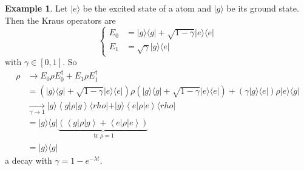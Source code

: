 \documentclass[12pt]{book}
\theoremstyle{definition}
\newtheorem*{expl}{\bfseries Example}
\newcommand{\scalar}[1]{\left\langle {#1}\right\rangle}
\let\shortto\to
\renewcommand{\to}{\longrightarrow}
\newcommand{\para}[1]{\left( {#1} \right)}
\newcommand{\bra}[1]{\langle {#1} \vert}
\newcommand{\ket}[1]{\vert {#1} \rangle}
\DeclareMathOperator{\tr}{tr}
\begin{document}
\begin{expl}
Let $\ket{e}$ be the excited state of a atom and $\ket{g}$ be its ground state. Then the Kraus operators are
\begin{equation*}
  \begin{cases}
    E_0 & = \ket{g}\bra{g} + \sqrt{1 - \gamma} \ket{e} \bra{e} \\
    E_1 & = \sqrt{\gamma} \ket{g}\bra{e}
  \end{cases}
\end{equation*}
with $\gamma \in [0, 1]$. So
\begin{align*}
  \rho & \to E_0 \rho E_0^\dagger + E_1 \rho E_1^\dagger \\
  & = \para{\ket{g} \bra{g} + \sqrt{1 - \gamma} \ket{e} \bra{e}} \rho \para{\ket{g} \bra{g} + \sqrt{1 - \gamma} \ket{e} \bra{e}} +   \para{\gamma \ket{g}\bra{e}} \rho \ket{e}\bra{g} \\
  & \underset{\gamma \shortto 1}{\to} \ket{g}\scalar{g \vert \rho \vert g} \bra{rho} + \ket{g}\scalar{e \vert \rho \vert e} \bra{rho} \\
  & = \ket{g}\bra{g} \underbrace{\para{\scalar{g \vert \rho \vert g} + \scalar{e \vert \rho \vert e}}}_{\tr \rho = 1} \\
  & = \ket{g}\bra{g}
\end{align*}
a decay with $\gamma = 1 - e^{-\lambda t}$.
\end{expl}
\end{document}
